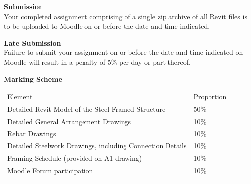 \newpage


\textbf{Submission}\\
Your completed assignment comprising of a single zip archive of all Revit files is to be uploaded to Moodle on or before the date and time indicated.  

\vspace{0.5cm}

\textbf{Late Submission}\\
Failure to submit your assignment on or before the date and time indicated on Moodle will result in a penalty of 5\% per day or part thereof.

\vspace{0.5cm}
\textbf{Marking Scheme}

\begin{table}[h!]
     \begin{center}
     \begin{tabular}{p{9cm}  p{2cm} }
     \toprule
      \textbf\large{Element} & \textbf\large{Proportion} \\ 
    \cmidrule(r){1-1}\cmidrule(lr){2-2}
    	Detailed Revit Model of the Steel Framed Structure 		 	& 50\%\\
    	Detailed General Arrangement Drawings 						& 10\%\\
        Rebar Drawings 												& 10\%\\
        Detailed Steelwork Drawings, including Connection Details 	& 10\%\\
        Framing Schedule (provided on A1 drawing) 					& 10\%\\
        Moodle Forum participation				 					& 10\%\\    
      \\ \bottomrule
      \end{tabular}
      \label{tbl:markSchemeAsmt3}
      \end{center}
 \end{table}

